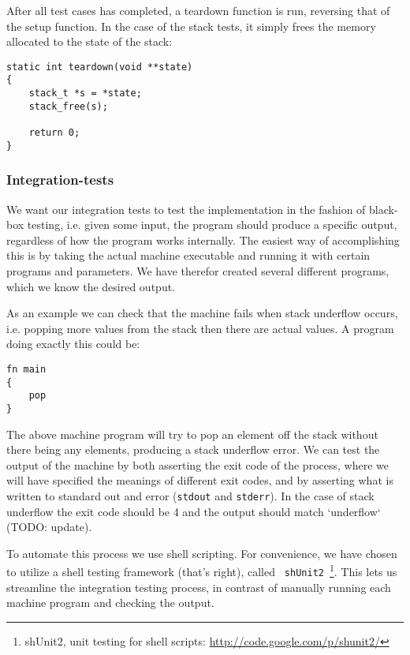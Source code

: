 After all test cases has completed, a teardown function is run, reversing that
of the setup function. In the case of the stack tests, it simply frees the
memory allocated to the state of the stack:
\begin{lstlisting}[language={[ANSI]C},caption={Unit-test teardown procedure}]
static int teardown(void **state)
{
    stack_t *s = *state;
    stack_free(s);

    return 0;
}
\end{lstlisting}


\subsubsection{Integration-tests}
We want our integration tests to test the implementation in the fashion of
black-box testing, i.e. given some input, the program should produce a specific
output, regardless of how the program works internally. The easiest way of
accomplishing this is by taking the actual machine executable and running it
with certain programs and parameters. We have therefor created several different
programs, which we know the desired output.

As an example we can check that the machine fails when stack underflow occurs,
i.e. popping more values from the stack then there are actual values. A program
doing exactly this could be:
\begin{lstlisting}[language={bytecode},caption={Machine program producing
stack underflow}]
fn main
{
	pop
}
\end{lstlisting}

The above machine program will try to pop an element off the stack without there
being any elements, producing a stack underflow error. We can test the output of
the machine by both asserting the exit code of the process, where we will have
specified the meanings of different exit codes, and by asserting what is written
to standard out and error ({\tt stdout} and {\tt stderr}). In the case of stack
underflow the exit code should be 4 and the output should match `underflow`
(TODO: update).

To automate this process we use shell scripting. For convenience, we have chosen
to utilize a shell testing framework (that's right), called {\tt
  shUnit2}~\footnote{shUnit2, unit testing for shell scripts:
  \url{http://code.google.com/p/shunit2/}}. This lets us streamline the
integration testing process, in contrast of manually running each machine
program and checking the output.

